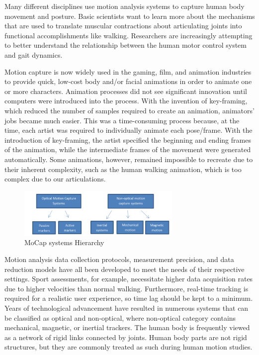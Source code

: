 Many different disciplines use motion analysis systems to capture human body movement and posture. Basic scientists want to learn more about the mechanisms that are used to translate muscular contractions about articulating joints into functional accomplishments like walking. Researchers are increasingly attempting to better understand the relationship between the human motor control system and gait dynamics.

Motion capture \cite{Review on Motion Capture Technology} is now widely used in the gaming, film, and animation industries to provide quick, low-cost body and/or facial animations in order to animate one or more characters. Animation processes did not see significant innovation until computers were introduced into the process. With the invention of key-framing, which reduced the number of samples required to create an animation, animators' jobs became much easier. This was a time-consuming process because, at the time, each artist was required to individually animate each pose/frame. With the introduction of key-framing, the artist specified the beginning and ending frames of the animation, while the intermediate frames of the movement were generated automatically. Some animations, however, remained impossible to recreate due to their inherent complexity, such as the human walking animation, which is too complex due to our articulations.

\begin{figure}[h]
	\centering
	\includegraphics[width=0.7\textwidth]{figures/Mocap.png}
	\caption{MoCap systems Hierarchy}
\end{figure}

Motion analysis data collection protocols, measurement precision, and data reduction models have all been developed to meet the needs of their respective settings. Sport assessments, for example, necessitate higher data acquisition rates due to higher velocities than normal walking. Furthermore, real-time tracking is required for a realistic user experience, so time lag should be kept to a minimum. Years of technological advancement have resulted in numerous systems that can be classified as optical and non-optical, where non-optical category contains mechanical, magnetic, or inertial trackers. The human body is frequently viewed as a network of rigid links connected by joints. Human body parts are not rigid structures, but they are commonly treated as such during human motion studies.